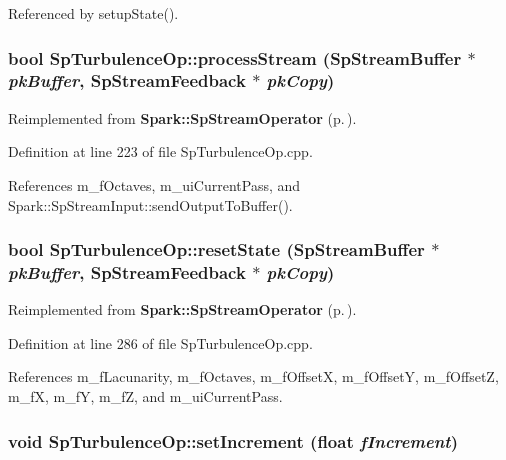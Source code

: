 Referenced by setup\-State().
\subsubsection{\setlength{\rightskip}{0pt plus 5cm}bool Sp\-Turbulence\-Op::process\-Stream ({\bf Sp\-Stream\-Buffer} $\ast$ {\em pk\-Buffer}, {\bf Sp\-Stream\-Feedback} $\ast$ {\em pk\-Copy})\hspace{0.3cm}{\tt  [protected, virtual]}}\label{classSpark_1_1SpTurbulenceOp_b2}




Reimplemented from {\bf Spark::Sp\-Stream\-Operator} {\rm (p.\,\pageref{classSpark_1_1SpStreamOperator_b3})}.

Definition at line 223 of file Sp\-Turbulence\-Op.cpp.

References m\_\-f\-Octaves, m\_\-ui\-Current\-Pass, and Spark::Sp\-Stream\-Input::send\-Output\-To\-Buffer().
\subsubsection{\setlength{\rightskip}{0pt plus 5cm}bool Sp\-Turbulence\-Op::reset\-State ({\bf Sp\-Stream\-Buffer} $\ast$ {\em pk\-Buffer}, {\bf Sp\-Stream\-Feedback} $\ast$ {\em pk\-Copy})\hspace{0.3cm}{\tt  [protected, virtual]}}\label{classSpark_1_1SpTurbulenceOp_b4}




Reimplemented from {\bf Spark::Sp\-Stream\-Operator} {\rm (p.\,\pageref{classSpark_1_1SpStreamOperator_b5})}.

Definition at line 286 of file Sp\-Turbulence\-Op.cpp.

References m\_\-f\-Lacunarity, m\_\-f\-Octaves, m\_\-f\-Offset\-X, m\_\-f\-Offset\-Y, m\_\-f\-Offset\-Z, m\_\-f\-X, m\_\-f\-Y, m\_\-f\-Z, and m\_\-ui\-Current\-Pass.
\subsubsection{\setlength{\rightskip}{0pt plus 5cm}void Sp\-Turbulence\-Op::set\-Increment (float {\em f\-Increment})}\label{classSpark_1_1SpTurbulenceOp_a9}


